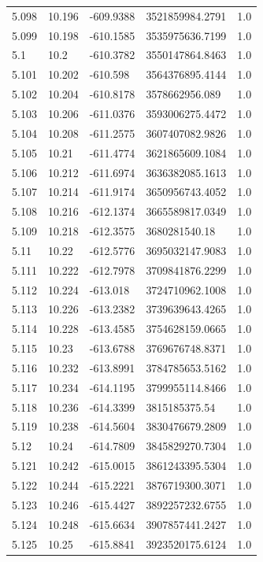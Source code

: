 \begin{tabular}{lllll}
5.098 & 10.196 & -609.9388 & 3521859984.2791 & 1.0 \\
5.099 & 10.198 & -610.1585 & 3535975636.7199 & 1.0 \\
5.1 & 10.2 & -610.3782 & 3550147864.8463 & 1.0 \\
5.101 & 10.202 & -610.598 & 3564376895.4144 & 1.0 \\
5.102 & 10.204 & -610.8178 & 3578662956.089 & 1.0 \\
5.103 & 10.206 & -611.0376 & 3593006275.4472 & 1.0 \\
5.104 & 10.208 & -611.2575 & 3607407082.9826 & 1.0 \\
5.105 & 10.21 & -611.4774 & 3621865609.1084 & 1.0 \\
5.106 & 10.212 & -611.6974 & 3636382085.1613 & 1.0 \\
5.107 & 10.214 & -611.9174 & 3650956743.4052 & 1.0 \\
5.108 & 10.216 & -612.1374 & 3665589817.0349 & 1.0 \\
5.109 & 10.218 & -612.3575 & 3680281540.18 & 1.0 \\
5.11 & 10.22 & -612.5776 & 3695032147.9083 & 1.0 \\
5.111 & 10.222 & -612.7978 & 3709841876.2299 & 1.0 \\
5.112 & 10.224 & -613.018 & 3724710962.1008 & 1.0 \\
5.113 & 10.226 & -613.2382 & 3739639643.4265 & 1.0 \\
5.114 & 10.228 & -613.4585 & 3754628159.0665 & 1.0 \\
5.115 & 10.23 & -613.6788 & 3769676748.8371 & 1.0 \\
5.116 & 10.232 & -613.8991 & 3784785653.5162 & 1.0 \\
5.117 & 10.234 & -614.1195 & 3799955114.8466 & 1.0 \\
5.118 & 10.236 & -614.3399 & 3815185375.54 & 1.0 \\
5.119 & 10.238 & -614.5604 & 3830476679.2809 & 1.0 \\
5.12 & 10.24 & -614.7809 & 3845829270.7304 & 1.0 \\
5.121 & 10.242 & -615.0015 & 3861243395.5304 & 1.0 \\
5.122 & 10.244 & -615.2221 & 3876719300.3071 & 1.0 \\
5.123 & 10.246 & -615.4427 & 3892257232.6755 & 1.0 \\
5.124 & 10.248 & -615.6634 & 3907857441.2427 & 1.0 \\
5.125 & 10.25 & -615.8841 & 3923520175.6124 & 1.0 \\

\end{tabular}
